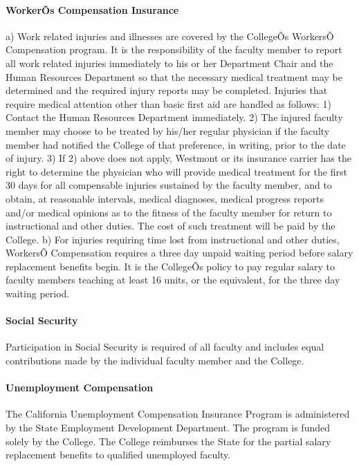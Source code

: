 \documentclass[letterpaper, 11pt]{article}
\begin{document}
			\paragraph{WorkerÕs Compensation Insurance}
				a) Work related injuries and illnesses are covered by the CollegeÕs WorkersÕ Compensation program.  It is the responsibility of the faculty member to report all work related injuries immediately to his or her Department Chair and the Human Resources Department so that the necessary medical treatment may be determined and the required injury reports may be completed. Injuries that require medical attention other than basic first aid are handled as follows:
				1) Contact the Human Resources Department immediately.
				2) The injured faculty member may choose to be treated by his/her regular physician if the faculty member had notified the College of that preference, in writing, prior to the date of injury.
				3) If 2) above does not apply, Westmont or its insurance carrier has the right to determine the physician who will provide medical treatment for the first 30 days for all compensable injuries sustained by the faculty member, and to obtain, at reasonable intervals, medical diagnoses, medical progress reports and/or medical opinions as to the fitness of the faculty member for return to instructional and other duties.  The cost of such treatment will be paid by the College.
				b) For injuries requiring time lost from instructional and other duties, WorkersÕ Compensation requires a three day unpaid waiting period before salary replacement benefits begin.  It is the CollegeÕs policy to pay regular salary to faculty members teaching at least 16 units, or the equivalent, for the three day waiting period.
			\paragraph{Social Security}
				Participation in Social Security is required of all faculty and includes equal contributions made by the individual faculty member and the College.
			\paragraph{Unemployment Compensation}
				The California Unemployment Compensation Insurance Program is administered by the State Employment Development Department.  The program is funded solely by the College. The College reimburses the State for the partial salary replacement benefits to qualified unemployed faculty.
\end{document}
